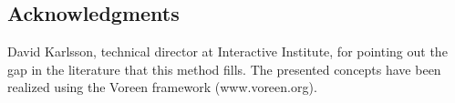 \documentclass{egpubl}
\begin{document}

\subsection{Acknowledgments}

David Karlsson, technical director at Interactive Institute, for pointing out the gap in the literature that this method fills. The presented concepts have been realized using the Voreen framework (www.voreen.org).

%

\end{document}

